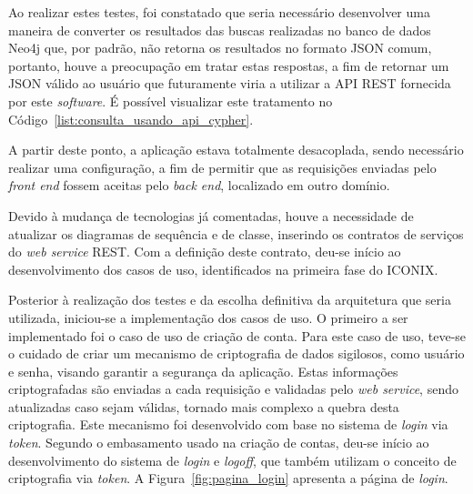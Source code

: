 
\par Ao realizar estes testes, foi constatado que seria necessário desenvolver uma maneira de converter os resultados das buscas realizadas no banco de dados Neo4j que, por padrão, não retorna os resultados no formato JSON comum, portanto, houve a preocupação em tratar estas respostas, a fim de retornar um JSON válido ao usuário que futuramente viria a utilizar a API REST fornecida por este \textit{software}. É possível visualizar este tratamento no Código~\ref{list:consulta_usando_api_cypher}. 
 
\par A partir deste ponto, a aplicação estava totalmente desacoplada, sendo necessário realizar uma configuração, a fim de permitir que as requisições enviadas pelo \textit{front end} fossem aceitas pelo \textit{back end}, localizado em outro domínio.

\par Devido à mudança de tecnologias já comentadas, houve a necessidade de atualizar os diagramas de sequência e de classe, inserindo os contratos de serviços do \textit{web service} REST. Com a definição deste contrato, deu-se início ao desenvolvimento dos casos de uso, identificados na primeira fase do ICONIX. 

\par Posterior à realização dos testes e da escolha definitiva da arquitetura que seria utilizada, iniciou-se a implementação dos casos de uso. O primeiro a ser implementado foi o caso de uso de criação de conta. Para este caso de uso, teve-se o cuidado de criar um mecanismo de criptografia de dados sigilosos, como usuário e senha, visando garantir a segurança da aplicação. Estas informações criptografadas são enviadas a cada requisição e validadas pelo \textit{web service}, sendo atualizadas caso sejam válidas, tornado mais complexo a quebra desta criptografia. Este mecanismo foi desenvolvido com base no sistema de \textit{login} via \textit{token}. Segundo o embasamento usado na criação de contas, deu-se início ao desenvolvimento do sistema de \textit{login} e \textit{logoff}, que também utilizam o conceito de criptografia via \textit{token}. A Figura~\ref{fig:pagina_login} apresenta a página de \textit{login}.

